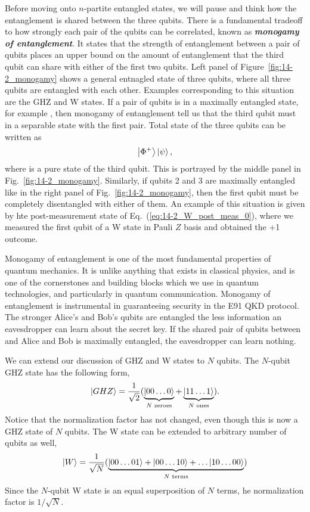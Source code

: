 Before moving onto $n$-partite entangled states, we will pause and think how the entanglement is shared between the three qubits.
There is a fundamental tradeoff to how strongly each pair of the qubits can be correlated, known as \textit{\textbf{monogamy of entanglement}}.
It states that the strength of entanglement between a pair of qubits places an upper bound on the amount of entanglement that the third qubit can share with either of the first two qubits.
Left panel of Figure~\ref{fig:14-2_monogamy} shows a general entnagled state of three qubits, where all three qubits are entangled with each other.
Examples corresponding to this situation are the GHZ and W states.
If a pair of qubits is in a maximally entangled state, for example \ket{\Phi+}, then monogamy of entanglement tell us that the third qubit must in a separable state with the first pair.
Total state of the three qubits can be written as
\begin{equation}
    \left| \Phi^+ \right\rangle\left| \psi \right\rangle,
\end{equation}
where \ket{\psi} is a pure state of the third qubit.
This is portrayed by the middle panel in Fig.~\ref{fig:14-2_monogamy}.
Similarly, if qubits 2 and 3 are maximally entangled like in the right panel of Fig.~\ref{fig:14-2_monogamy}, then the first qubit must be completely disentangled with either of them.
An example of this situation is given by hte post-measurement state of Eq.~(\ref{eq:14-2_W_post_meas_0}), where we measured the first qubit of a W state in Pauli $Z$ basis and obtained the +1 outcome.

Monogamy of entanglement is one of the most fundamental properties of quantum mechanics. It is unlike anything that exists in classical physics, and is one of the cornerstones and building blocks which we use in quantum technologies, and particularly in quantum communication.
Monogamy of entanglement is instrumental in guaranteeing security in the E91 QKD protocol.
The stronger Alice's and Bob's qubits are entangled the less information an eavesdropper can learn about the secret key.
If the shared pair of qubits between and Alice and Bob is maximally entangled, the eavesdropper can learn nothing.

We can extend our discussion of GHZ and W states to $N$ qubits.
The $N$-qubit GHZ state has the following form,
\begin{equation}
    \left| GHZ \right\rangle = \frac{1}{\sqrt{2}} ( \underbrace{\left| 00\ldots0 \right\rangle}_{N\text{ zeroes}} + \underbrace{\left| 11\ldots1 \right\rangle}_{N \text{ ones}} ).
\end{equation}
Notice that the normalization factor has not changed, even though this is now a GHZ state of $N$ qubits.
The W state can be extended to arbitrary number of qubits as well,
\begin{equation}
    \left| W \right\rangle = \frac{1}{\sqrt{N}} ( \underbrace{\left| 00\ldots01 \right\rangle + \left| 00\ldots10 \right\rangle + \ldots \left| 10\ldots00 \right\rangle}_{N \text{ terms}} )
\end{equation}
Since the $N$-qubit W state is an equal superposition of $N$ terms, he normalization factor is $1 / \sqrt{N}$.


